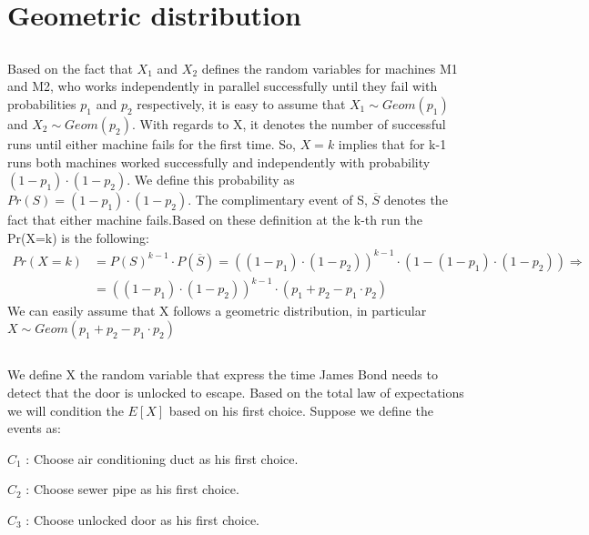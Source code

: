 \documentclass[11pt]{537homework}
\author{Emmanouil Kritharakis}
\begin{document}
\section{Geometric distribution}


\subsection{}
Based on the fact that $X_1$ and $X_2$ defines the random variables for machines M1 and M2, who works independently in parallel successfully until they fail with probabilities $p_1$ and $p_2$ respectively, it is easy to assume that $X_1 \sim Geom(p_1)$ and $X_2 \sim Geom(p_2)$. With regards to X, it denotes the number of successful runs until either machine fails for the first time. So, $X=k$ implies that for k-1 runs both machines worked successfully and independently with probability $(1-p_1)\cdot (1-p_2)$. We define this probability as $Pr(S) = (1-p_1)\cdot (1-p_2)$. The complimentary event of S, $\overline{S}$ denotes the fact that either machine fails.Based on these definition at the k-th run the Pr(X=k) is the following:
\begingroup
\allowdisplaybreaks
\begin{align*}
  Pr(X = k) &= P(S)^{k-1}\cdot P(\overline{S}) = ((1-p_1)\cdot (1-p_2))^{k-1} \cdot (1 - (1-p_1)\cdot (1-p_2)) \Longrightarrow \\
            &=  ((1-p_1)\cdot (1-p_2))^{k-1} \cdot (p_1 + p_2 - p_1 \cdot p_2)  
\end{align*}
\endgroup
We can easily assume that X follows a geometric distribution, in particular $X \sim  Geom(p_1 + p_2 - p_1 \cdot p_2)$
\subsection{}
We define X the random variable that express the time James Bond needs to detect that the door is unlocked to escape. Based on the total law of expectations we will condition the $E[X]$ based on his first choice. Suppose we define the events as:\\
\begin{description}[font=$\bullet$]
\item $C_1$ : Choose air conditioning duct as his first choice.
\item $C_2$ : Choose sewer pipe as his first choice.
\item $C_3$ : Choose unlocked door as his first choice.
\end{description}
\end{document}
